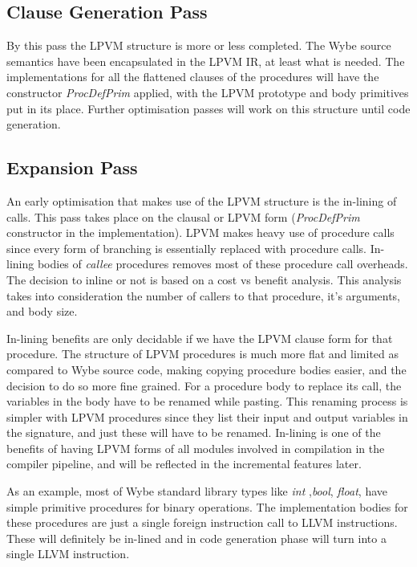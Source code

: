 \subsection{Clause Generation Pass}

By this pass the LPVM structure is more or less completed. The Wybe source
semantics have been encapsulated in the LPVM IR, at least what is needed. The
implementations for all the flattened clauses of the procedures will have the
constructor \textit{ProcDefPrim} applied, with the LPVM prototype and body
primitives put in its place. Further optimisation passes will work on this
structure until code generation.


\subsection{Expansion Pass}

An early optimisation that makes use of the LPVM structure is the in-lining of
calls. This pass takes place on the clausal or LPVM form (\textit{ProcDefPrim}
constructor in the implementation). LPVM makes heavy use of procedure calls
since every form of branching is essentially replaced with procedure
calls. In-lining bodies of \textit{callee} procedures removes most of these
procedure call overheads. The decision to inline or not is based on a cost vs
benefit analysis. This analysis takes into consideration the number of callers
to that procedure, it's arguments, and body size. 

In-lining benefits are only decidable if we have the LPVM clause form for that
procedure. The structure of LPVM procedures is much more flat and limited as
compared to Wybe source code, making copying procedure bodies easier, and the
decision to do so more fine grained. For a procedure body to replace its call,
the variables in the body have to be renamed while pasting. This renaming
process is simpler with LPVM procedures since they list their input and output
variables in the signature, and just these will have to be renamed. In-lining
is one of the benefits of having LPVM forms of all modules involved in
compilation in the compiler pipeline, and will be reflected in the incremental
features later.

As an example, most of Wybe standard library types like \textit{int}
,\textit{bool}, \textit{float}, have simple primitive procedures for binary
operations. The implementation bodies for these procedures are just a single
foreign instruction call to LLVM instructions. These will definitely be
in-lined and in code generation phase will turn into a single LLVM instruction.


